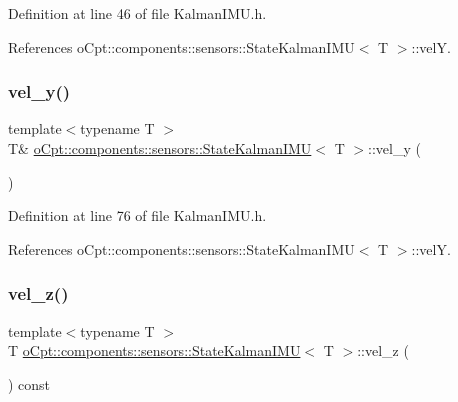Definition at line 46 of file Kalman\+I\+M\+U.\+h.



References o\+Cpt\+::components\+::sensors\+::\+State\+Kalman\+I\+M\+U$<$ T $>$\+::velY.

\hypertarget{classo_cpt_1_1components_1_1sensors_1_1_state_kalman_i_m_u_a7183397c22bf7b2f78b9b980a8dd9159}{}\label{classo_cpt_1_1components_1_1sensors_1_1_state_kalman_i_m_u_a7183397c22bf7b2f78b9b980a8dd9159} 
\subsubsection{\texorpdfstring{vel\+\_\+y()}{vel\_y()}\hspace{0.1cm}{\footnotesize\ttfamily [2/2]}}
{\footnotesize\ttfamily template$<$typename T $>$ \\
T\& \hyperlink{classo_cpt_1_1components_1_1sensors_1_1_state_kalman_i_m_u}{o\+Cpt\+::components\+::sensors\+::\+State\+Kalman\+I\+MU}$<$ T $>$\+::vel\+\_\+y (\begin{DoxyParamCaption}{ }\end{DoxyParamCaption})\hspace{0.3cm}{\ttfamily [inline]}}



Definition at line 76 of file Kalman\+I\+M\+U.\+h.



References o\+Cpt\+::components\+::sensors\+::\+State\+Kalman\+I\+M\+U$<$ T $>$\+::velY.

\hypertarget{classo_cpt_1_1components_1_1sensors_1_1_state_kalman_i_m_u_a7ea8e9ee9550f68d3036865b9c6fa046}{}\label{classo_cpt_1_1components_1_1sensors_1_1_state_kalman_i_m_u_a7ea8e9ee9550f68d3036865b9c6fa046} 
\subsubsection{\texorpdfstring{vel\+\_\+z()}{vel\_z()}\hspace{0.1cm}{\footnotesize\ttfamily [1/2]}}
{\footnotesize\ttfamily template$<$typename T $>$ \\
T \hyperlink{classo_cpt_1_1components_1_1sensors_1_1_state_kalman_i_m_u}{o\+Cpt\+::components\+::sensors\+::\+State\+Kalman\+I\+MU}$<$ T $>$\+::vel\+\_\+z (\begin{DoxyParamCaption}{ }\end{DoxyParamCaption}) const\hspace{0.3cm}{\ttfamily [inline]}}



